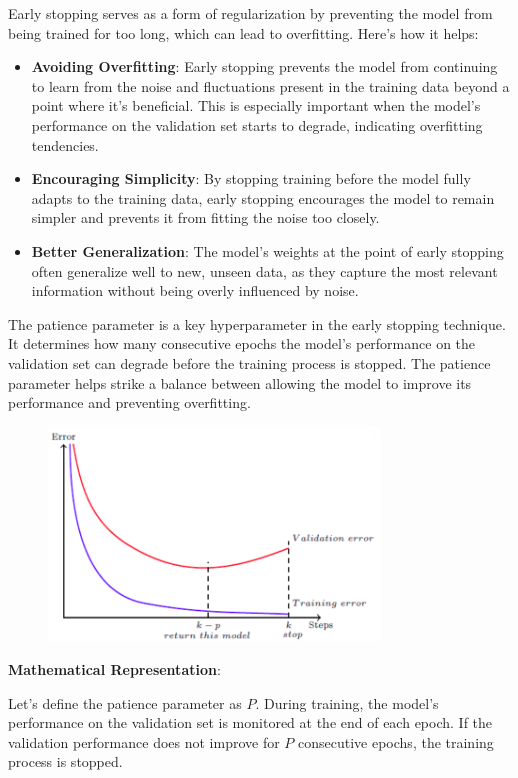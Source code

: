 \documentclass{report}
\begin{document}
Early stopping serves as a form of regularization by preventing the model from being trained for too long, which can lead to overfitting. Here's how it helps:
\begin{itemize}
	\item \textbf{Avoiding Overfitting}: Early stopping prevents the model from continuing to learn from the noise and fluctuations present in the training data beyond a point where it's beneficial. This is especially important when the model's performance on the validation set starts to degrade, indicating overfitting tendencies.

	\item \textbf{Encouraging Simplicity}: By stopping training before the model fully adapts to the training data, early stopping encourages the model to remain simpler and prevents it from fitting the noise too closely.

	\item \textbf{Better Generalization}: The model's weights at the point of early stopping often generalize well to new, unseen data, as they capture the most relevant information without being overly influenced by noise.
\end{itemize}

The patience parameter is a key hyperparameter in the early stopping technique. It determines how many consecutive epochs the model's performance on the validation set can degrade before the training process is stopped. The patience parameter helps strike a balance between allowing the model to improve its performance and preventing overfitting.

\begin{figure}[ht]
	\includegraphics[width=250pt]{22}
	\centering
\end{figure}

\textbf{Mathematical Representation}:

Let's define the patience parameter as \( P \). During training, the model's performance on the validation set is monitored at the end of each epoch. If the validation performance does not improve for \( P \) consecutive epochs, the training process is stopped.
\end{document}
